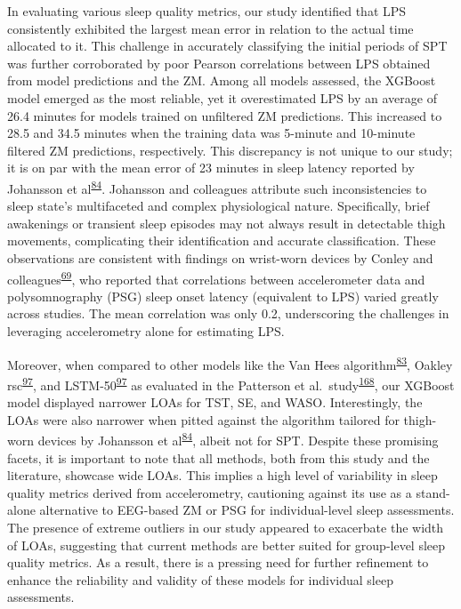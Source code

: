 \documentclass[
  10pt,
]{scrbook}
\begin{document}
In evaluating various sleep quality metrics, our study identified that
LPS consistently exhibited the largest mean error in relation to the
actual time allocated to it. This challenge in accurately classifying
the initial periods of SPT was further corroborated by poor Pearson
correlations between LPS obtained from model predictions and the ZM.
Among all models assessed, the XGBoost model emerged as the most
reliable, yet it overestimated LPS by an average of 26.4 minutes for
models trained on unfiltered ZM predictions. This increased to 28.5 and
34.5 minutes when the training data was 5-minute and 10-minute filtered
ZM predictions, respectively. This discrepancy is not unique to our
study; it is on par with the mean error of 23 minutes in sleep latency
reported by Johansson et
al\textsuperscript{\protect\hyperlink{ref-johansson_development_2023}{84}}.
Johansson and colleagues attribute such inconsistencies to sleep state's
multifaceted and complex physiological nature. Specifically, brief
awakenings or transient sleep episodes may not always result in
detectable thigh movements, complicating their identification and
accurate classification. These observations are consistent with findings
on wrist-worn devices by Conley and
colleagues\textsuperscript{\protect\hyperlink{ref-conley_agreement_2019}{69}},
who reported that correlations between accelerometer data and
polysomnography (PSG) sleep onset latency (equivalent to LPS) varied
greatly across studies. The mean correlation was only 0.2, underscoring
the challenges in leveraging accelerometry alone for estimating LPS.

Moreover, when compared to other models like the Van Hees
algorithm\textsuperscript{\protect\hyperlink{ref-hees_novel_2015}{83}},
Oakley
rsc\textsuperscript{\protect\hyperlink{ref-palotti_benchmark_2019}{97}},
and
LSTM-50\textsuperscript{\protect\hyperlink{ref-palotti_benchmark_2019}{97}}
as evaluated in the Patterson et
al.~study\textsuperscript{\protect\hyperlink{ref-patterson_40_2023}{168}},
our XGBoost model displayed narrower LOAs for TST, SE, and WASO.
Interestingly, the LOAs were also narrower when pitted against the
algorithm tailored for thigh-worn devices by Johansson et
al\textsuperscript{\protect\hyperlink{ref-johansson_development_2023}{84}},
albeit not for SPT. Despite these promising facets, it is important to
note that all methods, both from this study and the literature, showcase
wide LOAs. This implies a high level of variability in sleep quality
metrics derived from accelerometry, cautioning against its use as a
stand-alone alternative to EEG-based ZM or PSG for individual-level
sleep assessments. The presence of extreme outliers in our study
appeared to exacerbate the width of LOAs, suggesting that current
methods are better suited for group-level sleep quality metrics. As a
result, there is a pressing need for further refinement to enhance the
reliability and validity of these models for individual sleep
assessments.
\end{document}
